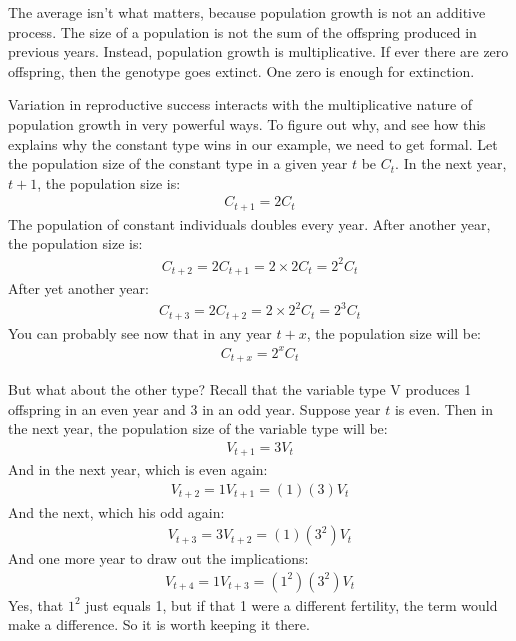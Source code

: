 \documentclass[10pt,reqno]{amsbook}
\numberwithin{equation}{chapter}
\begin{document}
The average isn't what matters, because population growth is not an additive process. The size of a population is not the sum of the offspring produced in previous years. Instead, population growth is multiplicative. If ever there are zero offspring, then the genotype goes extinct. One zero is enough for extinction. 

Variation in reproductive success interacts with the multiplicative nature of population growth in very powerful ways. To figure out why, and see how this explains why the constant type wins in our example, we need to get formal. Let the population size of the constant type in a given year $t$ be $C_t$. In the next year, $t+1$, the population size is:
\begin{align*}
	C_{t+1} = 2 C_t
\end{align*}
The population of constant individuals doubles every year. After another year, the population size is:
\begin{align*}
	C_{t+2} = 2 C_{t+1} = 2 \times 2 C_t = 2^2 C_t
\end{align*}
After yet another year:
\begin{align*}
	C_{t+3} = 2 C_{t+2} = 2 \times 2^2 C_t = 2^3 C_t
\end{align*}
You can probably see now that in any year $t+x$, the population size will be:
\begin{align*}
	C_{t+x} = 2^x C_t
\end{align*}

But what about the other type? Recall that the variable type V produces 1 offspring in an even year and 3 in an odd year. Suppose year $t$ is even. Then in the next year, the population size of the variable type will be:
\begin{align*}
	V_{t+1} = 3 V_t
\end{align*}
And in the next year, which is even again:
\begin{align*}
	V_{t+2} = 1 V_{t+1} = (1)(3) V_t
\end{align*}
And the next, which his odd again:
\begin{align*}
	V_{t+3} = 3 V_{t+2} = (1)(3^2) V_t
\end{align*}
And one more year to draw out the implications:
\begin{align*}
	V_{t+4} = 1 V_{t+3} = (1^2)(3^2) V_t
\end{align*}
Yes, that $1^2$ just equals 1, but if that 1 were a different fertility, the term would make a difference. So it is worth keeping it there.
\end{document}
